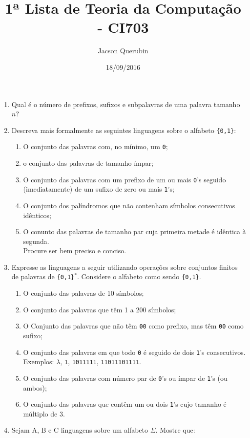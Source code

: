 \documentclass[a4paper,12pt]{article}
\title{1ª Lista de Teoria da Computação - CI703}
\author{Jacson Querubin}
\date{18/09/2016}
\begin{document}
\maketitle

\begin{enumerate}
	\item Qual é o número de prefixos, sufixos e subpalavras de uma palavra tamanho $n$?
	\item Descreva mais formalmente as seguintes linguagens sobre o alfabeto \texttt{\{0,1\}}:
	\begin{enumerate}
 		\item O conjunto das palavras com, no mínimo, um \texttt{0};
  		\item o conjunto das palavras de tamanho ímpar;
  		\item O conjunto das palavras com um prefixo de um ou mais \texttt{0}'s seguido (imediatamente) de um sufixo de zero ou mais \texttt{1}'s;
  		\item O conjunto dos palíndromos que não contenham símbolos consecutivos idênticos;
  		\item O conunto das palavras de tamanho par cuja primeira metade é idêntica à segunda.\\
  		Procure ser bem preciso e conciso.
 	\end{enumerate}
 	\item  Expresse as linguagens a seguir utilizando operações sobre conjuntos finitos de palavras de \texttt{\{0,1\}$^{\ast}$}. Considere o alfabeto como sendo \texttt{\{0,1\}}.
 	\begin{enumerate}
		\item O conjunto das palavras de 10 símbolos;
		\item O conjunto das palavras que têm 1 a 200 símbolos;
		\item O Conjunto das palavras que não têm \texttt{00} como prefixo, mas têm \texttt{00} como sufixo;
		\item O conjunto das palavras em que todo \texttt{0} é seguido de dois \texttt{1}'s consecutivos.\newline
		Exemplos: $\lambda$, \texttt{1}, \texttt{1011111}, \texttt{11011101111}.
		\item O conjunto das palavras com número par de \texttt{0}'s ou ímpar de \texttt{1}'s (ou ambos);
		\item O conjunto das palavras que contêm um ou dois \texttt{1}'s cujo tamanho é múltiplo de 3. 
	\end{enumerate}
	\item Sejam A, B e C linguagens sobre um alfabeto $\Sigma$. Mostre que:

\end{enumerate}
\end{document}
